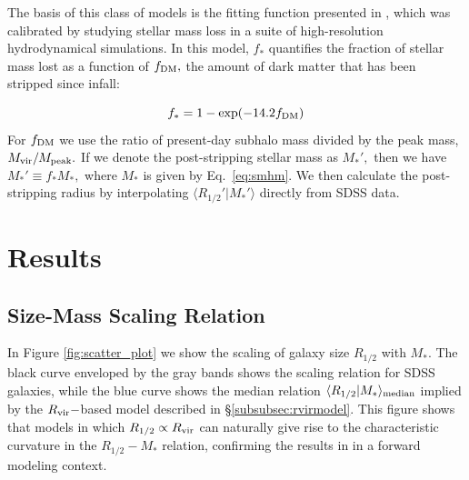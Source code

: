 \documentclass[usenatbib,usegraphicx,letterpaper]{mn2e}
\newcommand{\beq}{\begin{equation}}
\newcommand{\eeq}{\end{equation}}
\newcommand{\rhalf}{R_{1/2}}
\newcommand{\mstar}{M_{\ast}}
\newcommand{\rvir}{R_{\rm vir}}
\newcommand{\median}[2]{\langle{#1}\vert{#2}\rangle_{\rm median}}
\begin{document}
The basis of this class of models is the fitting function presented in \citet{smith_etal16}, which was calibrated by studying stellar mass loss in a suite of high-resolution hydrodynamical simulations. In this model, $f_{\ast}$ quantifies the fraction of stellar mass lost as a function of $f_{\rm DM},$ the amount of dark matter that has been stripped since infall:

\beq
f_{\ast} = 1 - \exp(-14.2f_{\rm DM})
\eeq
For $f_{\rm DM}$ we use the ratio of present-day subhalo mass divided by the peak mass, $M_{\rm vir}/M_{\rm peak}.$ If we denote the post-stripping stellar mass as $M_{\ast}',$ then we have $M_{\ast}'\equiv f_{\ast}M_{\ast},$ where $M_{\ast}$ is given by Eq.~\ref{eq:smhm}. We then calculate the post-stripping radius by interpolating $\langle\rhalf'\vert\mstar'\rangle$ directly from SDSS data.

\section{Results}
\label{sec:results}

\subsection{Size-Mass Scaling Relation}
\label{subsec:one_point_function}

In Figure \ref{fig:scatter_plot} we show the scaling of galaxy size $\rhalf$ with $\mstar.$ The black curve enveloped by the gray bands shows the scaling relation for SDSS galaxies, while the blue curve shows the median relation  $\median{\rhalf}{\mstar}$ implied by the $\rvir-$based model described in \S\ref{subsubsec:rvirmodel}. This figure shows that models in which $\rhalf\propto\rvir$ can naturally give rise to the characteristic curvature in the $\rhalf-\mstar$ relation, confirming the results in \citet{kravtsov13} in a forward modeling context.
\end{document}
